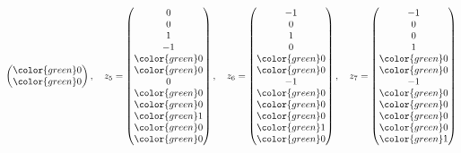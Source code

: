 \begin{loesung}
\[\begin{pmatrix}
\color{green} 0\\
\color{green} 0
\end{pmatrix}
,\quad
z_5=
\begin{pmatrix}
              0\\
              0\\
              1\\
             -1\\
\color{green} 0\\
\color{green} 0\\
              0\\
\color{green} 0\\
\color{green} 0\\
\color{green} 1\\
\color{green} 0\\
\color{green} 0
\end{pmatrix}
,\quad
z_6=\begin{pmatrix}
             -1\\
              0\\
              1\\
              0\\
\color{green} 0\\
\color{green} 0\\
             -1\\
\color{green} 0\\
\color{green} 0\\
\color{green} 0\\
\color{green} 1\\
\color{green} 0
\end{pmatrix}
,\quad
z_7=\begin{pmatrix}
             -1\\
              0\\
              0\\
              1\\
\color{green} 0\\
\color{green} 0\\
             -1\\
\color{green} 0\\
\color{green} 0\\
\color{green} 0\\
\color{green} 0\\
\color{green} 1
\end{pmatrix}
\]

\end{loesung}
